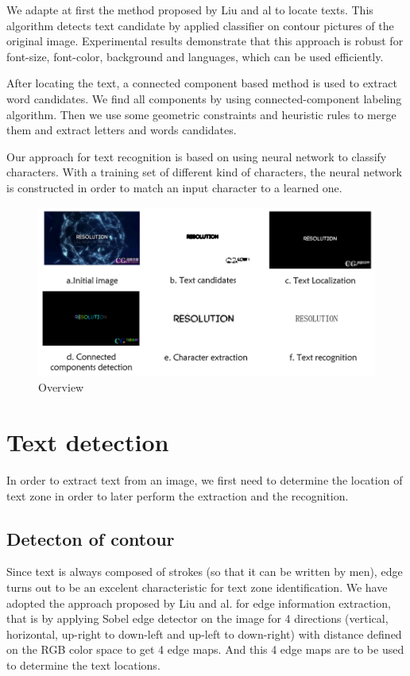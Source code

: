 \documentclass[paper=a4, french, 11pt]{scrartcl}
\begin{document}
We adapte at first the method proposed by Liu and al to locate texts. This algorithm detects text candidate by applied classifier on contour pictures of the original image. Experimental results demonstrate that this approach is robust for font-size, font-color, background and languages, which can be used efficiently.

After locating the text, a connected component based method is used to extract word candidates. We find all components by using connected-component labeling algorithm. Then we use some geometric constraints and heuristic rules to merge them and extract letters and words candidates.  

Our approach for text recognition is based on using neural network to classify characters. With a training set of different kind of characters, the neural network is constructed in order to match an input character to a learned one. 


\begin{figure}[h]
\begin{center}
	\vspace{-1ex}
   \includegraphics[width=0.9\linewidth]{process.png}
\end{center}
\vspace{-4ex}
\caption{Overview}
\label{fig:heatmap}
\end{figure}

\section{Text detection}
In order to extract text from an image, we first need to determine the location of text zone in order to later perform the extraction and the recognition.  
\subsection{Detecton of contour}
Since text is always composed of strokes (so that it can be written by men), edge turns out to be an excelent characteristic for text zone identification. We have adopted the approach proposed by Liu and al. for edge information extraction, that is by applying Sobel edge detector on the image for 4 directions (vertical, horizontal, up-right to down-left and up-left to down-right) with distance defined on the RGB color space to get 4 edge maps. And this 4 edge maps are to be used to determine the text locations.
\end{document}
